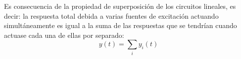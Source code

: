 \documentclass[11pt]{book} %
\begin{document}
    
    
    Es consecuencia de la propiedad de superposición de los circuitos lineales, es decir: la respuesta total debida a varias fuentes de excitación actuando simultáneamente es igual a la suma de las respuestas que se tendrían cuando actuase cada una de ellas por separado:
    \begin{equation*}
        y(t) = \sum_i y_i(t)
    \end{equation*}
    
\end{document}
